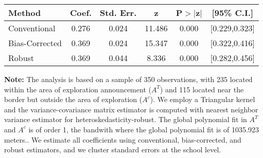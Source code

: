 \begin{table}[htbp]\centering
 \footnotesize 
\begin{tabular}{lccccc}
\hline\hline
Method & Coef. & Std. Err. & z & P$>|$z$|$ & [95\% C.I.] \\ 
\hline \hline  
Conventional & 0.276 & 0.024 & 11.486 & 0.000 & [0.229,0.323] \\ 
 Bias-Corrected & 0.369 & 0.024 & 15.347 & 0.000 & [0.322,0.416] \\ 
Robust & 0.369 & 0.044 & 8.336 & 0.000 & [0.282,0.456] \\ 
  \hline\hline
\end{tabular}
\label{table:rd}
\begin{tablenotes} 
  \justifying \tiny \textbf{Note: }    
   The analysis is based on a sample of 350 observations, with 235 located within the area of exploration announcement ($A^{T}$) and 115 located near the border but outside the area of exploration  ($A^{c}$). 
           We employ a Triangular kernel and the variance-covariance matrix estimator is computed with nearest neighbor variance estimator for heteroskedasticity-robust. The global polynomial fit in  $A^{T}$ and $A^{c}$ is of order 1, the bandwith where the global polynomial fit is of 1035.923 meters.. We estimate all coefficients using conventional, bias-corrected, and robust estimators, and we cluster standard errors at the school level. \end{tablenotes} 
 \end{table} 
